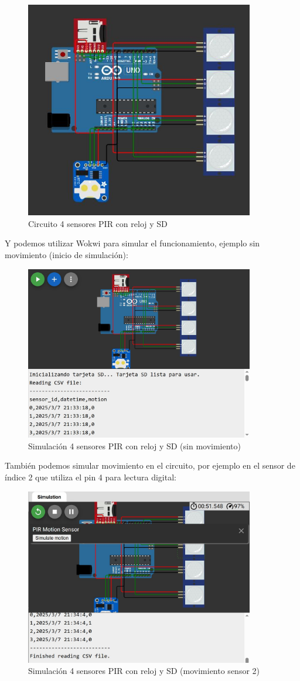 \begin{figure}[H]
    \centering
    \includegraphics[width = 10cm]{ImagenesLatex/sensor4.JPG}{}
    \caption{Circuito 4 sensores PIR con reloj y SD}
\end{figure}

Y podemos utilizar Wokwi para simular el funcionamiento, ejemplo sin movimiento (inicio de simulación):
\begin{figure}[H]
    \centering
    \includegraphics[width = 10cm]{ImagenesLatex/nomotion.JPG}{}
    \caption{Simulación 4 sensores PIR con reloj y SD (sin movimiento)}
\end{figure}

También podemos simular movimiento en el circuito, por ejemplo en el sensor de índice 2 que utiliza el pin 4 para lectura digital:

\begin{figure}[H]
    \centering
    \includegraphics[width = 10cm]{ImagenesLatex/motion_s2.JPG}{}
    \caption{Simulación 4 sensores PIR con reloj y SD (movimiento sensor 2)}
\end{figure}

